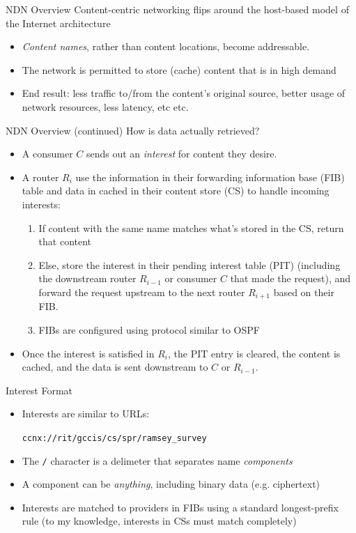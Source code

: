 \documentclass[handout]{beamer}
\begin{document}
\begin{frame}{NDN Overview}
	Content-centric networking flips around the host-based model of the Internet architecture
	\begin{itemize}
		\item \emph{Content names}, rather than content locations, become addressable. 
		\item The network is permitted to store (cache) content that is in high demand
		\item End result: less traffic to/from the content's original source, better usage of network resources, less latency, etc etc.
	\end{itemize}
\end{frame}

\begin{frame}{NDN Overview (continued)}
	How is data actually retrieved? 
	\begin{itemize}
		\item A consumer $C$ sends out an \emph{interest} for content they desire.
		\item A router $R_i$ use the information in their forwarding information base (FIB) table and data in cached in their content store (CS) to handle incoming interests:
		\begin{enumerate}
			\item If content with the same name matches what's stored in the CS, return that content
			\item Else, store the interest in their pending interest table (PIT) (including the downstream router $R_{i-1}$ or consumer $C$ that made the request), and forward the request upstream to the next router $R_{i+1}$ based on their FIB.
			\item FIBs are configured using protocol similar to OSPF
		\end{enumerate}
		\item Once the interest is satisfied in $R_i$, the PIT entry is cleared, the content is cached, and the data is sent downstream to $C$ or $R_{i-1}$. 
 	\end{itemize}
\end{frame}

\begin{frame}{Interest Format}
	\begin{itemize}
		\item Interests are similar to URLs: 
		\begin{center}
			{\tt ccnx://rit/gccis/cs/spr/ramsey\_survey}
		\end{center}
		\item The {\tt /} character is a delimeter that separates name \emph{components}
		\item A component can be \emph{anything}, including binary data (e.g. ciphertext)
		\item Interests are matched to providers in FIBs using a standard longest-prefix rule (to my knowledge, interests in CSs must match completely)
	\end{itemize}
\end{frame}
\end{document}
